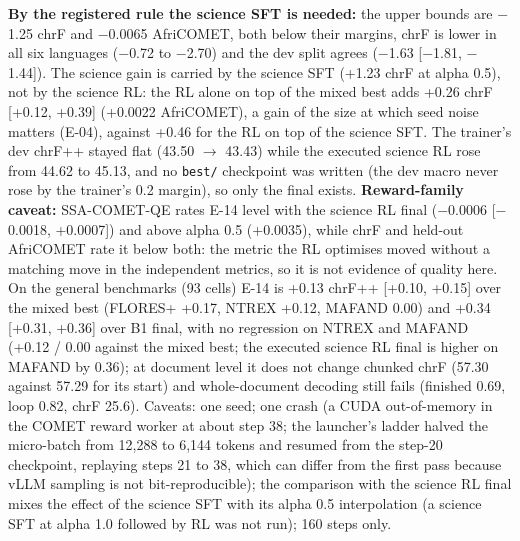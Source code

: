 \textbf{By the registered rule the science SFT is needed:} the upper bounds are \ensuremath{-}1.25 chrF and \ensuremath{-}0.0065 AfriCOMET, both below their margins, chrF is lower in all six languages (\ensuremath{-}0.72 to \ensuremath{-}2.70) and the dev split agrees (\ensuremath{-}1.63 [\ensuremath{-}1.81, \ensuremath{-}1.44]). The science gain is carried by the science SFT (+1.23 chrF at alpha 0.5), not by the science RL: the RL alone on top of the mixed best adds +0.26 chrF [+0.12, +0.39] (+0.0022 AfriCOMET), a gain of the size at which seed noise matters (E-04), against +0.46 for the RL on top of the science SFT. The trainer's dev chrF++ stayed flat (43.50 $\to$ 43.43) while the executed science RL rose from 44.62 to 45.13, and no \texttt{best/\allowbreak{}} checkpoint was written (the dev macro never rose by the trainer's 0.2 margin), so only the final exists. \textbf{Reward-family caveat:} SSA-COMET-QE rates E-14 level with the science RL final (\ensuremath{-}0.0006 [\ensuremath{-}0.0018, +0.0007]) and above alpha 0.5 (+0.0035), while chrF and held-out AfriCOMET rate it below both: the metric the RL optimises moved without a matching move in the independent metrics, so it is not evidence of quality here. On the general benchmarks (93 cells) E-14 is +0.13 chrF++ [+0.10, +0.15] over the mixed best (FLORES+ +0.17, NTREX +0.12, MAFAND 0.00) and +0.34 [+0.31, +0.36] over B1 final, with no regression on NTREX and MAFAND (+0.12 / 0.00 against the mixed best; the executed science RL final is higher on MAFAND by 0.36); at document level it does not change chunked chrF (57.30 against 57.29 for its start) and whole-document decoding still fails (finished 0.69, loop 0.82, chrF 25.6). Caveats: one seed; one crash (a CUDA out-of-memory in the COMET reward worker at about step 38; the launcher's ladder halved the micro-batch from 12,288 to 6,144 tokens and resumed from the step-20 checkpoint, replaying steps 21 to 38, which can differ from the first pass because vLLM sampling is not bit-reproducible); the comparison with the science RL final mixes the effect of the science SFT with its alpha 0.5 interpolation (a science SFT at alpha 1.0 followed by RL was not run); 160 steps only. 

